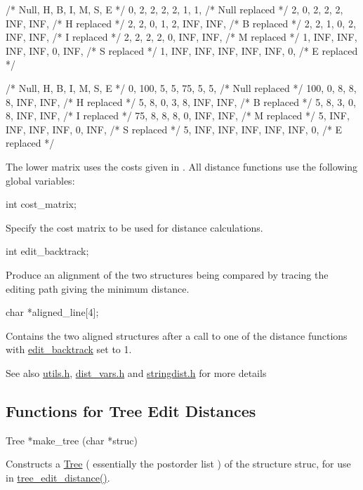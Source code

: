 \begin{DoxyVerb}/*  Null,   H,   B,   I,   M,   S,   E    */
   {   0,   2,   2,   2,   2,   1,   1},   /* Null replaced */
   {   2,   0,   2,   2,   2, INF, INF},   /* H    replaced */
   {   2,   2,   0,   1,   2, INF, INF},   /* B    replaced */
   {   2,   2,   1,   0,   2, INF, INF},   /* I    replaced */
   {   2,   2,   2,   2,   0, INF, INF},   /* M    replaced */
   {   1, INF, INF, INF, INF,   0, INF},   /* S    replaced */
   {   1, INF, INF, INF, INF, INF,   0},   /* E    replaced */


/* Null,   H,   B,   I,   M,   S,   E   */
   {   0, 100,   5,   5,  75,   5,   5},   /* Null replaced */
   { 100,   0,   8,   8,   8, INF, INF},   /* H    replaced */
   {   5,   8,   0,   3,   8, INF, INF},   /* B    replaced */
   {   5,   8,   3,   0,   8, INF, INF},   /* I    replaced */
   {  75,   8,   8,   8,   0, INF, INF},   /* M    replaced */
   {   5, INF, INF, INF, INF,   0, INF},   /* S    replaced */
   {   5, INF, INF, INF, INF, INF,   0},   /* E    replaced */
\end{DoxyVerb}


The lower matrix uses the costs given in \cite{shapiro:1990}. All distance functions use the following global variables\+:

\begin{DoxyVerb}int  cost_matrix;
\end{DoxyVerb}
 Specify the cost matrix to be used for distance calculations.

\begin{DoxyVerb}int   edit_backtrack;
\end{DoxyVerb}
 Produce an alignment of the two structures being compared by tracing the editing path giving the minimum distance.

\begin{DoxyVerb}char *aligned_line[4];
\end{DoxyVerb}
 Contains the two aligned structures after a call to one of the distance functions with \mbox{\hyperlink{dist__vars_8h_aa03194c513af6b860e7b33e370b82bdb}{edit\+\_\+backtrack}} set to 1.

\begin{DoxySeeAlso}{See also}
\mbox{\hyperlink{utils_8h}{utils.\+h}}, \mbox{\hyperlink{dist__vars_8h}{dist\+\_\+vars.\+h}} and \mbox{\hyperlink{stringdist_8h}{stringdist.\+h}} for more details
\end{DoxySeeAlso}
\hypertarget{distance_measures_sec_tree_edit_distance}{}\subsection{Functions for Tree Edit Distances}\label{distance_measures_sec_tree_edit_distance}
\begin{DoxyVerb}Tree   *make_tree (char *struc)
\end{DoxyVerb}
 Constructs a \mbox{\hyperlink{struct_tree}{Tree}} ( essentially the postorder list ) of the structure \textquotesingle{}struc\textquotesingle{}, for use in \mbox{\hyperlink{treedist_8h_a3b21f1925f7071f46d93431a835217bb}{tree\+\_\+edit\+\_\+distance()}}.


